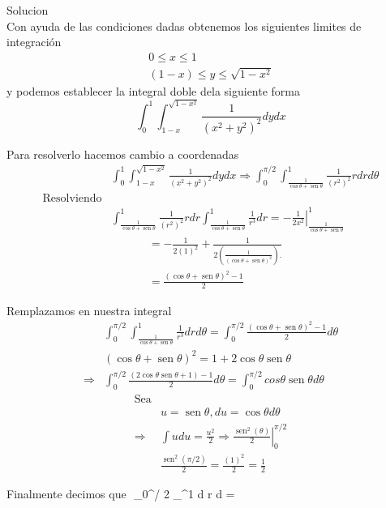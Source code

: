 Solucion\\
Con ayuda de las condiciones dadas obtenemos los siguientes limites de integración
$$
\begin{gathered}
0 \leq x \leq 1 \\
(1-x) \leq y \leq \sqrt{1-x^2}
\end{gathered}
$$
y podemos establecer la integral doble dela siguiente forma
$$
\int_0^1 \int_{1-x}^{\sqrt{1-x^2}} \frac{1}{\left(x^2+y^2\right)^2} d y d x
$$

Para resolverlo hacemos cambio a coordenadas
$$
\begin{aligned}
& \int_0^1 \int_{1-x}^{\sqrt{1-x^2}} \frac{1}{\left(x^2+y^2\right)^2} d y d x\Rightarrow \int_0^{\pi / 2} \int_{\frac{1}{\cos \theta+\operatorname{sen} \theta}}^1{\frac{1}{\left(r^2\right)^2} r d r d \theta} \\
\text{Resolviendo}\\
& \int_{\frac{1}{\cos \theta+\operatorname{sen} \theta}}^1{\frac{1}
{\left(r^2\right)^2} r d r} \int_{\frac{1}{\cos \theta+\operatorname{sen} \theta}}^1 \frac{1}{r^3} d r=-\left.\frac{1}{2 x^2}\right|_{\frac{1}{\cos \theta+\operatorname{sen} \theta}}^1
\end{aligned}
$$
$$
\begin{aligned}
& =-\frac{1}{2(1)^2}+\frac{1}{2\left(\frac{1}{(\cos \theta+\operatorname{sen} \theta)^2}\right).} \\
& =\frac{(\cos \theta+\operatorname{sen} \theta)^2-1}{2}
\end{aligned}
$$

Remplazamos en nuestra integral
$$
\begin{aligned}
& \int_0^{\pi / 2} \int_{\frac{1}{\cos \theta+\operatorname{sen} \theta}}^1 \frac{1}{r^3} d r d \theta=\int_0^{\pi / 2} \frac{(\cos\theta+\operatorname{sen} \theta)^2-1}{2} d \theta \\
& (\cos \theta+\operatorname{sen} \theta)^2=1+2 \cos \theta \operatorname{sen} \theta \\
\Rightarrow & \int_0^{\pi / 2} \frac{(2\operatorname{cos}\theta \operatorname{sen} \theta+1)-1}{2} d \theta=\int_0^{\pi / 2} cos \theta \operatorname{sen} \theta d \theta
\end{aligned}
$$
$$
\begin{aligned}
\text{Sea}\\
&u=\operatorname{sen} \theta, d u=\cos \theta d \theta \\
\Rightarrow & \int u d u=\left.\frac{u^2}{2} \Rightarrow \frac{\operatorname{sen}^2(\theta)}{2}\right|_0 ^{\pi / 2} \\
& \frac{\operatorname{sen}^2(\pi / 2)}{2}=\frac{(1)^2}{2}=\frac{1}{2}
\end{aligned}
$$

Finalmente decimos que
$$
\int_0^{\pi / 2} \int_{}^1  d r d \theta=
